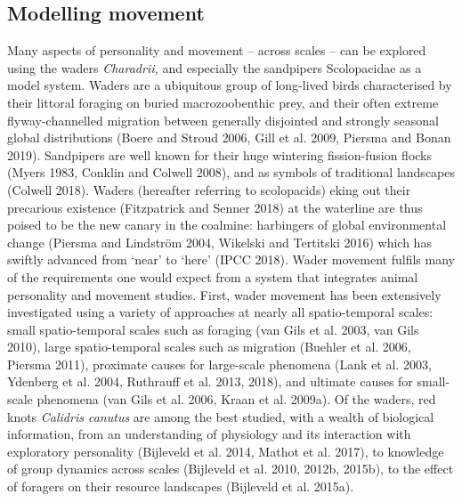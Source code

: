 \documentclass[]{scrartcl}
\begin{document}
\begin{linenumbers}
\section{Modelling movement}\label{modelling-movement}

Many aspects of personality and movement -- across scales -- can be
explored using the waders \emph{Charadrii,} and especially the
sandpipers Scolopacidae as a model system. Waders are a ubiquitous group
of long-lived birds characterised by their littoral foraging on buried
macrozoobenthic prey, and their often extreme flyway-channelled
migration between generally disjointed and strongly seasonal global
distributions (Boere and Stroud 2006, Gill et al. 2009, Piersma and
Bonan 2019). Sandpipers are well known for their huge wintering
fission-fusion flocks (Myers 1983, Conklin and Colwell 2008), and as
symbols of traditional landscapes (Colwell 2018). Waders (hereafter
referring to scolopacids) eking out their precarious existence
(Fitzpatrick and Senner 2018) at the waterline are thus poised to be the
new canary in the coalmine: harbingers of global environmental change
(\protect\hypertarget{__UnoMark__44501_2549695377}{}{\protect\hypertarget{ZOTERO_BREF_Jo6zuDEr7hJE}{}{\protect\hypertarget{__UnoMark__39624_623588325}{}{\protect\hypertarget{__UnoMark__53929_4107183634}{}{}}}}Piersma
and Lindström 2004, Wikelski and Tertitski 2016) which has swiftly
advanced from `near' to `here' (IPCC 2018). Wader movement fulfils many
of the requirements one would expect from a system that integrates
animal personality and movement studies. First, wader movement has been
extensively investigated using a variety of approaches at nearly all
spatio-temporal scales: small spatio-temporal scales such as foraging
(van Gils et al. 2003, van Gils 2010), large spatio-temporal scales such
as migration (Buehler et al. 2006, Piersma 2011), proximate causes for
large-scale phenomena (Lank et al. 2003, Ydenberg et al. 2004, Ruthrauff
et al. 2013, 2018), and ultimate causes for small-scale phenomena (van
Gils et al. 2006, Kraan et al. 2009a). Of the waders, red knots
\emph{Calidris canutus} are among the best studied, with a wealth of
biological information, from an understanding of physiology and its
interaction with exploratory personality (Bijleveld et al. 2014, Mathot
et al. 2017), to knowledge of group dynamics across scales (Bijleveld et
al. 2010, 2012b, 2015b), to the effect of foragers on their resource
landscapes (Bijleveld et al. 2015a).


\end{linenumbers}
\end{document}
